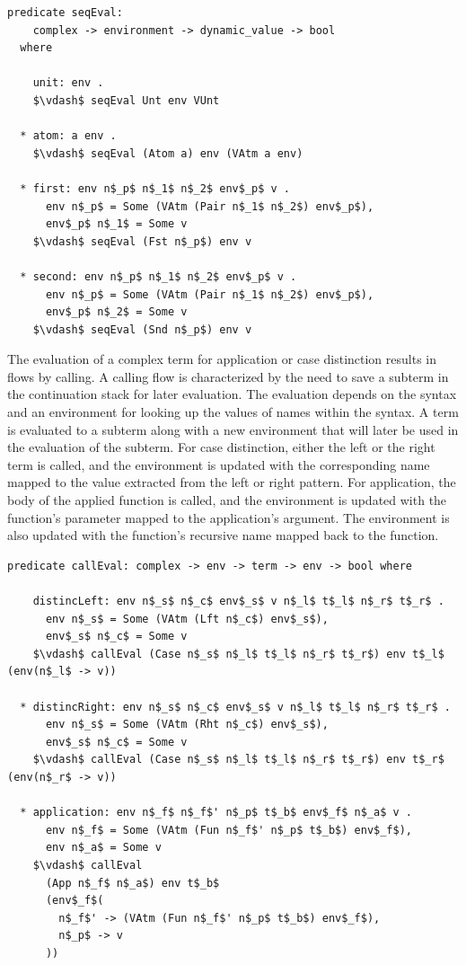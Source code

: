 \documentclass[letterpaper, 11pt]{report}
\begin{document}
\begin{lstlisting}[language=logic, mathescape]
  predicate seqEval:
    complex -> environment -> dynamic_value -> bool 
  where

    unit: env . 
    $\vdash$ seqEval Unt env VUnt

  * atom: a env .
    $\vdash$ seqEval (Atom a) env (VAtm a env)

  * first: env n$_p$ n$_1$ n$_2$ env$_p$ v . 
      env n$_p$ = Some (VAtm (Pair n$_1$ n$_2$) env$_p$),
      env$_p$ n$_1$ = Some v
    $\vdash$ seqEval (Fst n$_p$) env v

  * second: env n$_p$ n$_1$ n$_2$ env$_p$ v . 
      env n$_p$ = Some (VAtm (Pair n$_1$ n$_2$) env$_p$), 
      env$_p$ n$_2$ = Some v 
    $\vdash$ seqEval (Snd n$_p$) env v
\end{lstlisting}

The evaluation of a complex term for application or case distinction 
results in flows by calling. A calling flow is characterized
by the need to save a subterm in the continuation stack for later evaluation.
The evaluation depends on the syntax
and an environment for looking up the values of names within the syntax.
A term is evaluated to a subterm along with a new environment that will
later be used in the evaluation of the subterm. For case distinction, either the left or the right
term is called, and the environment is updated with the corresponding name mapped to the
value extracted from the left or right pattern. For application, the body of the applied function 
is called, and the environment is updated with the function's parameter mapped to the
application's argument. The environment is also updated with the function's recursive name mapped back to
the function.

\begin{lstlisting}[language=logic, mathescape]
  predicate callEval: complex -> env -> term -> env -> bool where

    distincLeft: env n$_s$ n$_c$ env$_s$ v n$_l$ t$_l$ n$_r$ t$_r$ .
      env n$_s$ = Some (VAtm (Lft n$_c$) env$_s$),
      env$_s$ n$_c$ = Some v
    $\vdash$ callEval (Case n$_s$ n$_l$ t$_l$ n$_r$ t$_r$) env t$_l$ (env(n$_l$ -> v))

  * distincRight: env n$_s$ n$_c$ env$_s$ v n$_l$ t$_l$ n$_r$ t$_r$ .
      env n$_s$ = Some (VAtm (Rht n$_c$) env$_s$),
      env$_s$ n$_c$ = Some v
    $\vdash$ callEval (Case n$_s$ n$_l$ t$_l$ n$_r$ t$_r$) env t$_r$ (env(n$_r$ -> v))

  * application: env n$_f$ n$_f$' n$_p$ t$_b$ env$_f$ n$_a$ v .
      env n$_f$ = Some (VAtm (Fun n$_f$' n$_p$ t$_b$) env$_f$),
      env n$_a$ = Some v
    $\vdash$ callEval
      (App n$_f$ n$_a$) env t$_b$
      (env$_f$(
        n$_f$' -> (VAtm (Fun n$_f$' n$_p$ t$_b$) env$_f$),
        n$_p$ -> v
      ))
\end{lstlisting}
  
\end{document}
